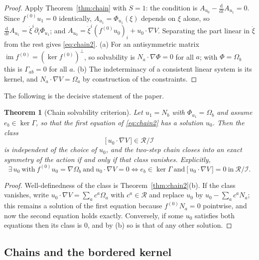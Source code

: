 \documentclass[12pt]{article}
\theoremstyle{plain}
\newtheorem{theorem}{Theorem}[section]
\theoremstyle{definition}
\theoremstyle{remark}
\DeclareMathOperator{\im}{im}
\newcommand{\dd}{\mathrm{d}}
\newcommand{\pd}[1]{\partial_{#1}}
\newcommand{\Om}{\Omega}
\newcommand{\Ical}{\mathcal{I}}
\newcommand{\Rring}{\mathcal{R}}
\begin{document}
	\begin{proof}
		Apply Theorem~\ref{thm:chain} with $S=1$: the condition is
		$A_{u_{0}}-\tfrac{\dd}{\dd t}A_{u_{1}}=0$. Since $f^{(0)}u_{1}=0$ identically,
		$A_{u_{1}}=\Phi_{u_{1}}(\xi)$ depends on $\xi$ alone, so
		$\tfrac{\dd}{\dd t}A_{u_{1}}=\dot\xi^{i}\pd{i}\Phi_{u_{1}}$; and
		$A_{u_{0}}=\dot\xi^{i}(f^{(0)}u_{0})_{i}+u_{0}\cdot\nabla V$. Separating the
		part linear in $\dot\xi$ from the rest gives \eqref{eq:chain2}. (a) For an
		antisymmetric matrix $\im f^{(0)}=(\ker f^{(0)})^{\perp}$, so solvability is
		$N_{a}\cdot\nabla\Phi=0$ for all $a$; with $\Phi=\Om_{b}$ this is
		$\Gamma_{ab}=0$ for all $a$. (b) The indeterminacy of a consistent linear system
		is its kernel, and $N_{a}\cdot\nabla V=\Om_{a}$ by construction of the
		constraints.
	\end{proof}
	
	The following is the decisive statement of the paper.
	
	\begin{theorem}[Chain solvability criterion]
		\label{thm:chain-decisive}
		Let $u_{1}=N_{b}$ with $\Phi_{u_{1}}=\Om_{b}$ and assume $e_{b}\in\ker\Gamma$,
		so that the first equation of \eqref{eq:chain2} has a solution $u_{0}$. Then the
		class
		\begin{equation}
			\bigl[\,u_{0}\cdot\nabla V\,\bigr]\in\Rring/\Ical
			\label{eq:class}
		\end{equation}
		is independent of the choice of $u_{0}$, and the two-step chain closes into an
		exact symmetry of the action if and only if that class vanishes. Explicitly,
		\[
		\exists\,u_{0}\ \text{with}\ f^{(0)}u_{0}=\nabla\Om_{b}
		\ \text{and}\ u_{0}\cdot\nabla V=0
		\iff
		e_{b}\in\ker\Gamma
		\ \text{and}\
		\bigl[\,u_{0}\cdot\nabla V\,\bigr]=0\ \text{in}\ \Rring/\Ical .
		\]
	\end{theorem}
	
	\begin{proof}
		Well-definedness of the class is Theorem~\ref{thm:chain2}(b). If the class
		vanishes, write $u_{0}\cdot\nabla V=\sum_{a}c^{a}\Om_{a}$ with
		$c^{a}\in\Rring$ and replace $u_{0}$ by $u_{0}-\sum_{a}c^{a}N_{a}$; this remains
		a solution of the first equation because $f^{(0)}N_{a}=0$ pointwise, and now the
		second equation holds exactly. Conversely, if some $u_{0}$ satisfies both
		equations then its class is $0$, and by (b) so is that of any other solution.
	\end{proof}
	
	\subsection{Chains and the bordered kernel}
	
\end{document}
